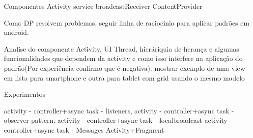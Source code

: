 Componentes
	Activity
	service
	broadcastReceiver
	ContentProvider



Como DP resolvem problemas, seguir linha de raciocinio para aplicar padrões em
android.


Analise do componente Activity, UI Thread, hieráriquia de herança e algumas
funcionalidades que dependem da activity e como isso interfere na aplicação do
padrão(Por experiência confirmo que é negativa). mostrar exemplo de uma view em
lista para smartphone e outra para tablet com grid usando o mesmo modelo

Experimentos

activity - controller+async task - listeners,
activity - controller+async task - observer pattern,
activity - controller+async task - localbroadcast
activity - controller+async task - Messages
Activity+Fragment


